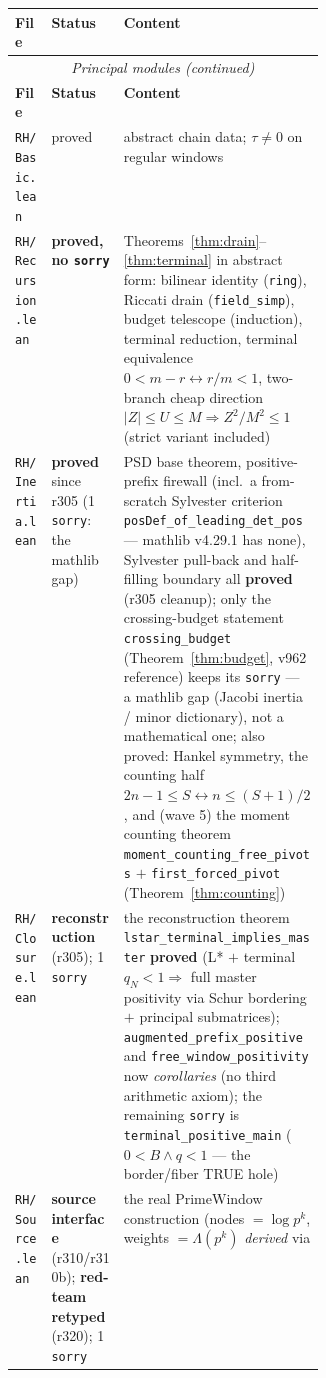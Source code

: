 \documentclass[11pt]{article}
\theoremstyle{definition}
\theoremstyle{remark}
\begin{document}
\begingroup\small
\begin{longtable}{@{}llp{0.36\linewidth}@{}}
\toprule
\textbf{File} & \textbf{Status} & \textbf{Content}\\
\midrule
\endfirsthead
\multicolumn{3}{c}{\small\itshape Principal modules (continued)}\\
\toprule
\textbf{File} & \textbf{Status} & \textbf{Content}\\
\midrule
\endhead
\texttt{RH/Basic.lean} & proved & abstract chain data; $\tau\ne0$ on
regular windows\\
\texttt{RH/Recursion.lean} & \textbf{proved, no \texttt{sorry}} &
Theorems~\ref{thm:drain}--\ref{thm:terminal} in abstract form: bilinear
identity (\texttt{ring}), Riccati drain (\texttt{field\_simp}), budget
telescope (induction), terminal reduction, terminal equivalence
$0<m-r\leftrightarrow r/m<1$, two-branch cheap direction
$|Z|\le U\le M\Rightarrow Z^2/M^2\le1$ (strict variant included)\\
\texttt{RH/Inertia.lean} & \textbf{proved} since r305 (1
\texttt{sorry}: the mathlib gap) & PSD base theorem, positive-prefix
firewall (incl.\ a from-scratch Sylvester criterion
\texttt{posDef\_of\_leading\_det\_pos} --- mathlib v4.29.1 has
none), Sylvester pull-back and half-filling boundary all
\textbf{proved} (r305 cleanup); only the crossing-budget statement
\texttt{crossing\_budget} (Theorem~\ref{thm:budget}, v962
reference) keeps its \texttt{sorry} --- a mathlib gap (Jacobi
inertia / minor dictionary), not a mathematical one; also proved:
Hankel symmetry, the counting half
$2n-1\le S\leftrightarrow n\le(S{+}1)/2$, and (wave 5) the moment
counting theorem \texttt{moment\_counting\_free\_pivots} $+$
\texttt{first\_forced\_pivot} (Theorem~\ref{thm:counting})\\
\texttt{RH/Closure.lean} & \textbf{reconstruction} (r305); 1
\texttt{sorry} & the reconstruction theorem
\texttt{lstar\_terminal\_implies\_master} \textbf{proved} (L* $+$
terminal $q_N<1 \Rightarrow$ full master positivity via Schur
bordering $+$ principal submatrices);
\texttt{augmented\_prefix\_positive} and
\texttt{free\_window\_positivity} now \emph{corollaries} (no third
arithmetic axiom); the remaining \texttt{sorry} is
\texttt{terminal\_positive\_main} ($0<B \wedge q<1$ --- the
border/fiber TRUE hole)\\
\texttt{RH/Source.lean} & \textbf{source interface}
(r310/r310b); \textbf{red-team retyped} (r320); 1 \texttt{sorry} &
the real PrimeWindow construction
(nodes $=\log p^k$, weights $=\Lambda(p^k)$ \emph{derived} via

\end{longtable}
\end{document}
